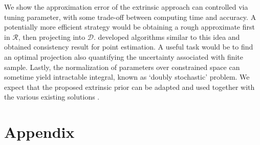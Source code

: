\documentclass[10pt]{article}
\newcommand{\mc}[1]{\mathcal{#1}}
\DeclareMathOperator{\1}{\mathbbm{1}}
\begin{document}
We show the approximation error of the extrinsic approach can controlled via tuning parameter, with some trade-off between computing time and accuracy. A potentially more efficient strategy would be obtaining a rough approximate first in $\mc R$, then projecting into $\mc D$. \cite{lin2016extrinsic} developed algorithms similar to this idea and obtained consistency result for point estimation. A useful task would be to find an optimal projection also quantifying the uncertainty associated with finite sample. Lastly, the normalization of parameters over constrained space can sometime yield intractable integral, known as `doubly stochastic' problem. We expect that the proposed extrinsic prior can be adapted and used together with the various existing solutions \citep{rao2016data,stoehr2017noisy}.






\section{Appendix}
\end{document}
